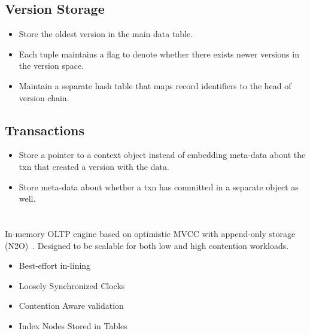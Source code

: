 \documentclass[11pt]{article}
\begin{document}
\subsection*{Version Storage}
\begin{itemize}
    \item 
    Store the oldest version in the main data table.
    
    \item 
    Each tuple maintains a flag to denote whether there exists newer versions in the version space.
    
    \item
    Maintain a separate hash table that maps record identifiers to the head of version chain.
\end{itemize}

\subsection*{Transactions}
\begin{itemize}
    \item
    Store a pointer to a context object instead of embedding meta-data about the txn that created a version with the data.

    \item
    Store meta-data about whether a txn has committed in a separate object as well.
\end{itemize}

\section{}
In-memory OLTP engine based on optimistic MVCC with append-only storage (N2O)~\cite{p21-lim}.
Designed to be scalable for both low and high contention workloads.
\begin{itemize}
    \item Best-effort in-lining
    \item Loosely Synchronized Clocks
    \item Contention Aware validation
    \item Index Nodes Stored in Tables
\end{itemize}
\end{document}
